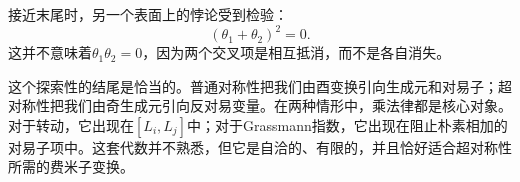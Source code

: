 接近末尾时，另一个表面上的悖论受到检验：
\begin{equation}
(\theta_1+\theta_2)^2=0.
\end{equation}
这并不意味着\(\theta_1\theta_2=0\)，因为两个交叉项是相互抵消，而不是各自消失。

\begin{classroomqa}
\end{classroomqa}

\begin{classroomqa}
\end{classroomqa}

这个探索性的结尾是恰当的。普通对称性把我们由酉变换引向生成元和对易子；超对称性把我们由奇生成元引向反对易变量。在两种情形中，乘法律都是核心对象。对于转动，它出现在\([L_i,L_j]\)中；对于Grassmann指数，它出现在阻止朴素相加的对易子项中。这套代数并不熟悉，但它是自洽的、有限的，并且恰好适合超对称性所需的费米子变换。
